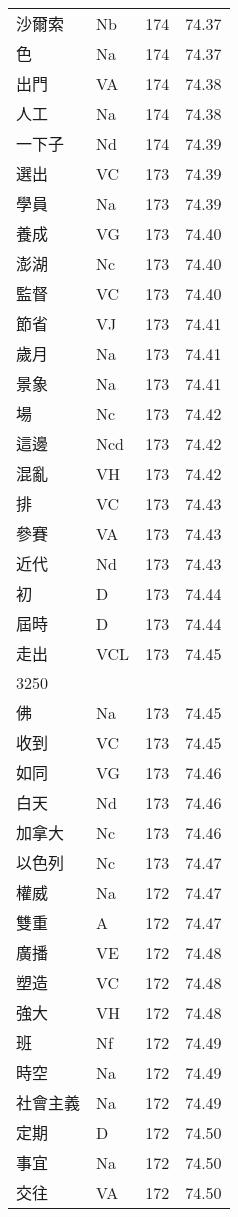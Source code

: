 \documentclass[twocolumn]{book}
\begin{document}
\begin{supertabular}{llrr}
沙爾索 & Nb & 174 &  74.37\\
色 & Na & 174 &  74.37\\
出門 & VA & 174 &  74.38\\
人工 & Na & 174 &  74.38\\
一下子 & Nd & 174 &  74.39\\
選出 & VC & 173 &  74.39\\
學員 & Na & 173 &  74.39\\
養成 & VG & 173 &  74.40\\
澎湖 & Nc & 173 &  74.40\\
監督 & VC & 173 &  74.40\\
節省 & VJ & 173 &  74.41\\
歲月 & Na & 173 &  74.41\\
景象 & Na & 173 &  74.41\\
場 & Nc & 173 &  74.42\\
這邊 & Ncd & 173 &  74.42\\
混亂 & VH & 173 &  74.42\\
排 & VC & 173 &  74.43\\
參賽 & VA & 173 &  74.43\\
近代 & Nd & 173 &  74.43\\
初 & D & 173 &  74.44\\
屆時 & D & 173 &  74.44\\
走出 & VCL & 173 &  74.45\\
3250\\
佛 & Na & 173 &  74.45\\
收到 & VC & 173 &  74.45\\
如同 & VG & 173 &  74.46\\
白天 & Nd & 173 &  74.46\\
加拿大 & Nc & 173 &  74.46\\
以色列 & Nc & 173 &  74.47\\
權威 & Na & 172 &  74.47\\
雙重 & A & 172 &  74.47\\
廣播 & VE & 172 &  74.48\\
塑造 & VC & 172 &  74.48\\
強大 & VH & 172 &  74.48\\
班 & Nf & 172 &  74.49\\
時空 & Na & 172 &  74.49\\
社會主義 & Na & 172 &  74.49\\
定期 & D & 172 &  74.50\\
事宜 & Na & 172 &  74.50\\
交往 & VA & 172 &  74.50\\

\end{supertabular}
\end{document}
